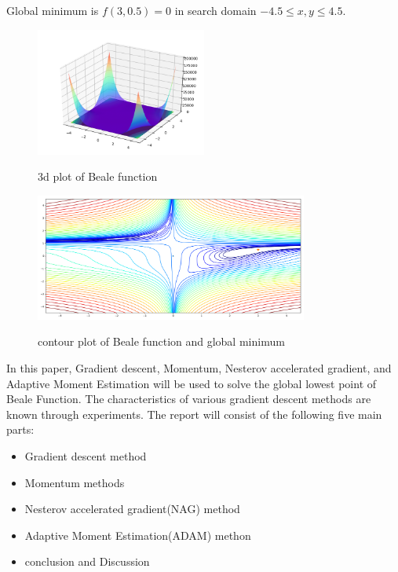 \documentclass[aps,letterpaper,10pt]{article}
\begin{document}
Global minimum is $f(3,0.5)=0$ in search domain $-4.5\leq x,y\leq 4.5$.

\begin{figure}[H]
  \centering
  \label{fig:Beale1}\includegraphics[width=0.5\textwidth]{3dplot.png}\
  \caption{3d plot of Beale function }
\end{figure}

\begin{figure}[H]
  \centering
  \label{fig:Beale2}\includegraphics[width=0.8\textwidth]{contour.png}\
  \caption{contour plot of Beale function and global minimum}
\end{figure}



In this paper, Gradient descent, Momentum, Nesterov accelerated gradient, and Adaptive Moment Estimation will be used to solve the global lowest point of Beale Function. The characteristics of various gradient descent methods are known through experiments. The report will consist of the following five main parts:
\begin{itemize}
	\item Gradient descent method
	\item Momentum methods
	\item Nesterov accelerated gradient(NAG) method
  \item Adaptive Moment Estimation(ADAM) methon
	\item conclusion and Discussion
\end{itemize}
\vspace{3mm}
\end{document}
